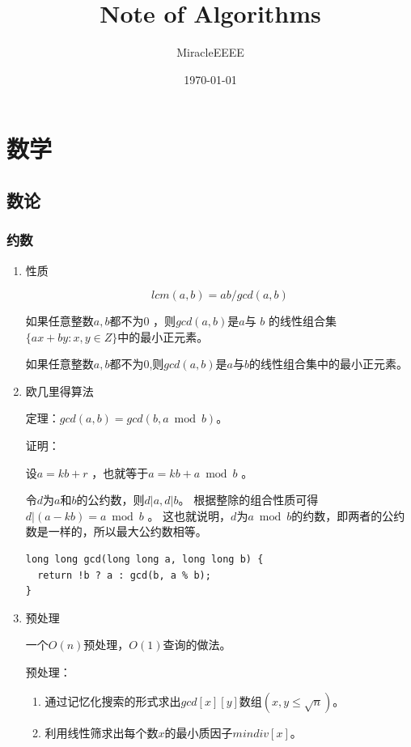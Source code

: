 \documentclass[11pt]{article}
\author{MiracleEEEE}
\date{\today}
\title{Note of Algorithms}
\begin{document}
\maketitle
\tableofcontents


\section{数学}
\label{sec-1}
\subsection{数论}
\label{sec-1-1}
\subsubsection{约数}
\label{sec-1-1-1}
\begin{enumerate}
\item 性质
\label{sec-1-1-1-1}

$$
lcm(a,b) = ab/gcd(a,b)
$$

如果任意整数\(a,b\)都不为\(0\) ，则\(gcd(a,b)\)是\(a\)与 \(b\) 的线性组合集\(\{ax+by:x,y \in Z\}\)中的最小正元素。

如果任意整数\(a,b\)都不为\(0\),则\(gcd(a,b)\)是\(a\)与\(b\)的线性组合集中的最小正元素。

\item 欧几里得算法
\label{sec-1-1-1-2}

定理：\(gcd(a, b) = gcd(b, a \bmod b)\)。

证明：

设\(a = kb + r\) ，也就等于\(a = kb + a \bmod b\) 。

令\(d\)为\(a\)和\(b\)的公约数，则\(d|a,d|b\)。 根据整除的组合性质可得\(d|(a-kb)=a \bmod b\) 。
这也就说明，\(d\)为\(a \bmod b\)的约数，即两者的公约数是一样的，所以最大公约数相等。

\begin{verbatim}
long long gcd(long long a, long long b) {
  return !b ? a : gcd(b, a % b);
}
\end{verbatim}

\item 预处理
\label{sec-1-1-1-3}

一个\(O(n)\)预处理，\(O(1)\)查询的做法。

预处理：

\begin{enumerate}
\item 通过记忆化搜索的形式求出\(gcd[x][y]\)数组\((x,y \leq\sqrt{n})\)。

\item 利用线性筛求出每个数\(x\)的最小质因子\(mindiv[x]\)。


\end{enumerate}
\end{enumerate}
\end{document}
